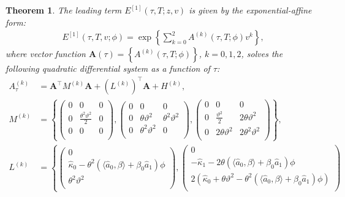 \documentclass[pdftex,11pt,a4paper] {article}
\newtheorem{theorem}{Theorem}[section]
\begin{document}
\begin{theorem}
The leading term $E^{[1]}(\tau,T;z,v)$ is given by the exponential-affine form: 
\begin{equation}\label{eq:aff_expan_ord1_lead}
\begin{split}
& E^{[1]}(\tau,T,v; \phi)= \exp \left\{\sum^{2}_{k=0}A^{(k)}(\tau,T;\phi)v^{k}  \right\},
\end{split}
\end{equation}
where vector function $\mathbf{A}(\tau)=\left\{A^{(k)}(\tau,T;\phi)\right\}$, $k=0,1,2$, solves the following quadratic differential system as a function of $\tau$:
\begin{equation}\label{eq:OrigMGFLogAndQVFirsOrder}
\begin{split}
A^{(k)}_\tau&=\mathbf{A}^\top M^{(k)}\mathbf{A} + \left(L^{(k)}\right)^\top \mathbf{A} + H^{(k)},\\
M^{(k)}&=\left\{
\begin{pmatrix} %
0 & 0 & 0 \\
0 & \frac{\theta^2\vartheta^2}{2} & 0 \\ 
0 & 0 & 0 \\
\end{pmatrix}, 
\begin{pmatrix} %
0 & 0 & 0 \\
0 & \theta\vartheta^2 & \theta^2\vartheta^2 \\
0 & \theta^2\vartheta^2 & 0 \\
\end{pmatrix}, 
\begin{pmatrix} %
0 & 0 & 0 \\
0 & \frac{\vartheta^2}{2} & 2\theta\vartheta^2 \\
0 &  2\theta\vartheta^2  & 2\theta^2\vartheta^2 \\
\end{pmatrix}
\right\},\\
L^{(k)}&=\left\{\begin{pmatrix} %
0 \\ \hat\kappa_0-\theta^2(\langle \hat a_0, \beta\rangle+\beta_0 \hat a_1) \phi \\ \theta^2\vartheta^2 \\
\end{pmatrix},
\begin{pmatrix} %
0 \\ -\hat\kappa_1-2\theta(\langle \hat a_0, \beta\rangle+\beta_0 \hat a_1) \phi \\ 2(\hat\kappa_0+\theta\vartheta^2-\theta^2(\langle \hat a_0, \beta\rangle+\beta_0 \hat a_1) \phi)\\

\end{pmatrix}
\end{split}
\end{equation}
\end{theorem}
\end{document}
